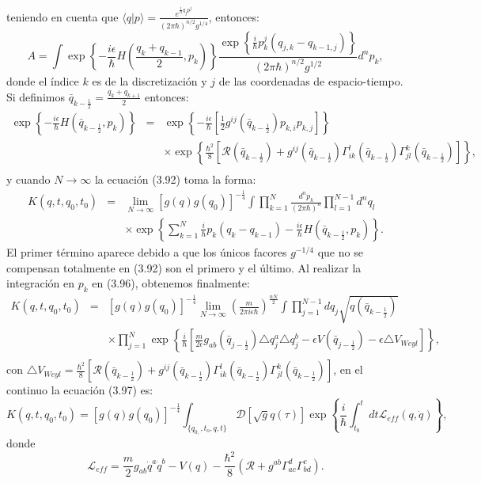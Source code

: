 teniendo en cuenta que $\langle q|p\rangle=\frac{e^{\frac{i}{\hbar}q_{j}p^{j}}}{(2\pi\hbar)^{n/2}g^{1/4}}$, entonces:
\begin{equation}
A= \int\exp\left\{ -\frac{i\epsilon}{\hbar}H\left(\frac{q_{k}+q_{k-1}}{2},p_{k}\right)\right\} \frac{\exp\left\{ \frac{i}{\hbar}p_{k}^{j}(q_{j,k}-q_{k-1,j})\right\} }{(2\pi\hbar)^{n/2}g^{1/2}}d^{n}p_{k},
\end{equation}
donde el índice $k$ es de la discretización y $j$ de las coordenadas de espacio-tiempo. Si definimos $\bar{q}_{k-\frac{1}{2}}=\frac{q_k+q_{k+1}}{2}$ entonces:
\begin{eqnarray}
\nonumber \exp\left\{ -\frac{i\epsilon}{\hbar}H(\bar{q}_{k-\frac{1}{2}},p_{k})\right\} &=&\exp\left\{ -\frac{i\epsilon}{\hbar}\left[\frac{1}{2}g^{ij}(\bar{q}_{k-\frac{1}{2}})p_{k,i}p_{k,j}\right]\right\} \\
\nonumber && \times \exp\left\{ \frac{\hbar^{2}}{8}[\mathcal{R}(\bar{q}_{k-\frac{1}{2}})+g^{ij}(\bar{q}_{k-\frac{1}{2}})\Gamma_{ik}^{l}(\bar{q}_{k-\frac{1}{2}})\Gamma_{jl}^{k}(\bar{q}_{k-\frac{1}{2}})]\right\} ,\\
\end{eqnarray}
y cuando $N\to \infty $ la ecuación (3.92) toma la forma:
\begin{eqnarray}
\nonumber K(q,t,q_{0},t_{0})&=&\lim_{N\to\infty}[g(q)g(q_{0})]^{-\frac{1}{4}}\int\prod_{k=1}^{N}\frac{d^{n}p_{k}}{(2\pi\hbar)^{n}}\prod_{l=1}^{N-1}d^{n}q_{l}\\
&&\times \exp\left\{ \sum_{k=1}^{N}\frac{i}{\hbar}p_{k}(q_{k}-q_{k-1})-\frac{i\epsilon}{\hbar}H(\bar{q}_{k-\frac{1}{2}},p_{k})\right\} .
\end{eqnarray}
El primer término aparece debido a que los únicos facores $g^{-1/4}$ que no se compensan totalmente en (3.92) son el primero y el último. Al realizar la integración en $p_k$ en (3.96), obtenemos finalmente:
\begin{eqnarray}
\nonumber K(q,t,q_{0},t_{0})&=&[g(q)g(q_{0})]^{-\frac{1}{4}}\lim_{N\to\infty}\left(\frac{m}{2\pi i\epsilon\hbar}\right)^{\frac{nN}{2}}\int\prod_{j=1}^{N-1}dq_{j}\sqrt{q(\bar{q}_{k-\frac{1}{2}})}\\
\nonumber && \times \prod_{j=1}^{N}\exp\left\{ \frac{i}{\hbar}\left[\frac{m}{2\epsilon}g_{ab}(\bar{q}_{j-\frac{1}{2}})\triangle q_{j}^{a}\triangle q_{j}^{b}-\epsilon V(\bar{q}_{j-\frac{1}{2}})-\epsilon\triangle V_{Weyl}\right]\right\},\\ 
\end{eqnarray}
con $\triangle V_{Weyl}=\frac{\hbar^{2}}{8}[\mathcal{R}(\bar{q}_{k-\frac{1}{2}})+g^{ij}(\bar{q}_{k-\frac{1}{2}})\Gamma_{ik}^{l}(\bar{q}_{k-\frac{1}{2}})\Gamma_{jl}^{k}(\bar{q}_{k-\frac{1}{2}})]$, en el continuo la ecuación (3.97) es:
\begin{equation}
K(q,t,q_{0},t_{0})=[g(q)g(q_{0})]^{-\frac{1}{4}}\int_{\{q_{0,},t_{o},q,t\}}\mathcal{D}[\sqrt{g}q(\tau)]\exp\left\{ \frac{i}{\hbar}\int_{t_{0}}^{t}dt\mathcal{L}_{eff}(q,\dot{q})\right\} ,
\end{equation}
donde 
\begin{equation}
\mathcal{L}_{eff}=\frac{m}{2}g_{ab}\dot{q}^{a}\dot{q}^{b}-V(q)-\frac{\hbar^{2}}{8}(\mathcal{R}+g^{ab}\Gamma_{ac}^{d}\Gamma_{bd}^{c}).
\end{equation}
\newpage 


